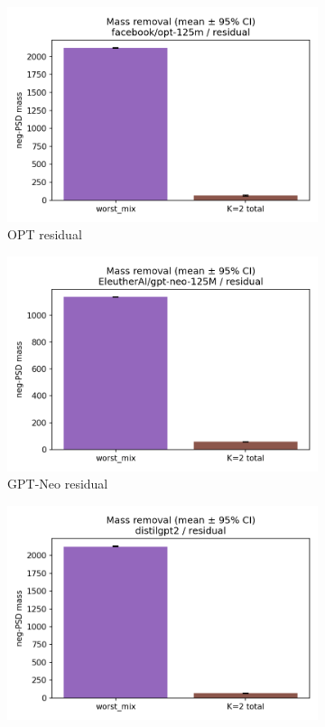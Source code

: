 \documentclass[11pt]{article}
\newcommand{\1}{\mathbf{1}}
\begin{document}
\begin{figure}[t]
\centering
\begin{subfigure}[t]{0.32\textwidth}
\includegraphics[width=\linewidth]{figs/mass_removal_facebook_opt-125m_residual.png}
\caption{OPT residual}
\end{subfigure}\hfill
\begin{subfigure}[t]{0.32\textwidth}
\includegraphics[width=\linewidth]{figs/mass_panel_EleutherAI_gpt-neo-125M_residual.png}
\caption{GPT-Neo residual}
\end{subfigure}\hfill
\begin{subfigure}[t]{0.32\textwidth}
\includegraphics[width=\linewidth]{figs/mass_panel_distilgpt2_residual.png}

\end{subfigure}
\end{figure}
\end{document}
